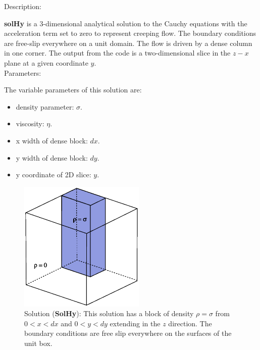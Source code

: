   {\large \fontB Description:}
  
  {\bf solHy} is a 3-dimensional analytical solution to the Cauchy equations with the acceleration term set to zero
  to represent creeping flow. The boundary conditions are free-slip everywhere on a unit domain. 
  The flow is driven by a dense column in one corner. The output from the code is a two-dimensional slice
  in the $z - x$ plane at a given coordinate $y$.
  \\

  {\large \fontB Parameters:}
 
  The variable parameters of this solution are:
  \begin{itemize}
    \item{density parameter: $ \sigma $.}
    \item{viscosity: $\eta$.}
    \item{x width of dense block: $dx$.}
    \item{y width of dense block: $dy$.}
    \item{y coordinate of 2D slice: $y$.}
    \end{itemize}

  \begin{figure}
    \includegraphics[width=6cm,clip]{../figs/figH.eps}
    \caption[Short caption]{\label{figHy} 
      Solution ({\bf SolHy}):
      This solution has a block of density $\rho = \sigma$
       from $ 0 < x < dx $ and $ 0 < y < dy $ extending in the $z$ direction.
      The boundary conditions are free slip everywhere on the surfaces of the unit box.}
  \end{figure} 
  

